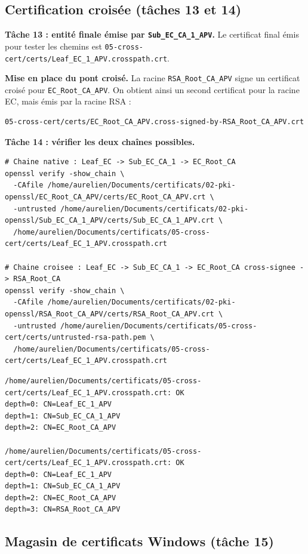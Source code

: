 \documentclass[11pt,a4paper]{article}
\newcommand{\tri}{\texttt{APV}}
\newcommand{\fichier}[1]{\texttt{#1}}
\begin{document}
\subsection{Certification croisée (tâches 13 et 14)}
\label{sec:cross}

\textbf{Tâche 13 : entité finale émise par \texttt{Sub\_EC\_CA\_1\_\tri}.}
Le certificat final émis pour tester les chemins est
\fichier{05-cross-cert/certs/Leaf\_EC\_1\_\tri.crosspath.crt}.

\textbf{Mise en place du pont croisé.} La racine \texttt{RSA\_Root\_CA\_\tri} signe un
certificat croisé pour \texttt{EC\_Root\_CA\_\tri}. On obtient ainsi un second
certificat pour la racine EC, mais émis par la racine RSA :
\begin{lstlisting}[style=out]
05-cross-cert/certs/EC_Root_CA_APV.cross-signed-by-RSA_Root_CA_APV.crt
\end{lstlisting}

\textbf{Tâche 14 : vérifier les deux chaînes possibles.}
\begin{lstlisting}[style=cmd]
# Chaine native : Leaf_EC -> Sub_EC_CA_1 -> EC_Root_CA
openssl verify -show_chain \
  -CAfile /home/aurelien/Documents/certificats/02-pki-openssl/EC_Root_CA_APV/certs/EC_Root_CA_APV.crt \
  -untrusted /home/aurelien/Documents/certificats/02-pki-openssl/Sub_EC_CA_1_APV/certs/Sub_EC_CA_1_APV.crt \
  /home/aurelien/Documents/certificats/05-cross-cert/certs/Leaf_EC_1_APV.crosspath.crt

# Chaine croisee : Leaf_EC -> Sub_EC_CA_1 -> EC_Root_CA cross-signee -> RSA_Root_CA
openssl verify -show_chain \
  -CAfile /home/aurelien/Documents/certificats/02-pki-openssl/RSA_Root_CA_APV/certs/RSA_Root_CA_APV.crt \
  -untrusted /home/aurelien/Documents/certificats/05-cross-cert/certs/untrusted-rsa-path.pem \
  /home/aurelien/Documents/certificats/05-cross-cert/certs/Leaf_EC_1_APV.crosspath.crt
\end{lstlisting}
\begin{lstlisting}[style=out]
/home/aurelien/Documents/certificats/05-cross-cert/certs/Leaf_EC_1_APV.crosspath.crt: OK
depth=0: CN=Leaf_EC_1_APV
depth=1: CN=Sub_EC_CA_1_APV
depth=2: CN=EC_Root_CA_APV

/home/aurelien/Documents/certificats/05-cross-cert/certs/Leaf_EC_1_APV.crosspath.crt: OK
depth=0: CN=Leaf_EC_1_APV
depth=1: CN=Sub_EC_CA_1_APV
depth=2: CN=EC_Root_CA_APV
depth=3: CN=RSA_Root_CA_APV
\end{lstlisting}


\subsection{Magasin de certificats Windows (tâche 15)}
\label{sec:winstore}
\end{document}
